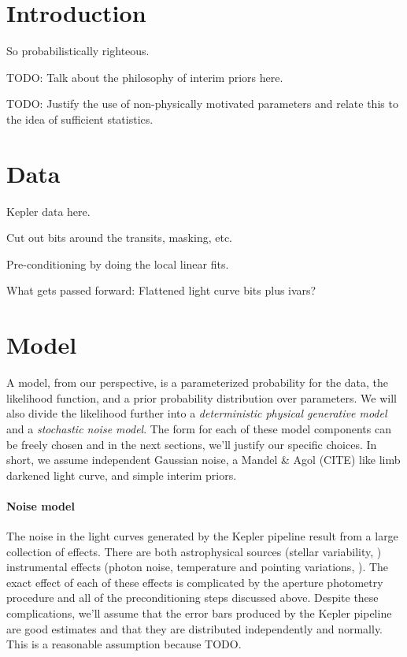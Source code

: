 \documentclass[12pt,preprint]{aastex}
\begin{document}
\section{Introduction}

So probabilistically righteous.

TODO: Talk about the philosophy of interim priors here.

TODO: Justify the use of non-physically motivated parameters and relate this
to the idea of sufficient statistics.

\section{Data}

Kepler data here.

Cut out bits around the transits, masking, etc.

Pre-conditioning by doing the local linear fits.

What gets passed forward:  Flattened light curve bits plus ivars?

\section{Model}

A model, from our perspective, is a parameterized probability for the data,
the likelihood function, and a prior probability distribution over parameters.
We will also divide the likelihood further into a \emph{deterministic physical
generative model} and a \emph{stochastic noise model}.
The form for each of these model components can be freely chosen and in the
next sections, we'll justify our specific choices.
In short, we assume independent Gaussian noise, a Mandel \& Agol (CITE) like
limb darkened light curve, and simple interim priors.

\paragraph{Noise model}
The noise in the light curves generated by the Kepler pipeline result from a
large collection of effects.
There are both astrophysical sources (stellar variability, \etc) instrumental
effects (photon noise, temperature and pointing variations, \etc).
The exact effect of each of these effects is complicated by the aperture
photometry procedure and all of the preconditioning steps discussed above.
Despite these complications, we'll assume that the error bars produced by the
Kepler pipeline are good estimates and that they are distributed independently
and normally.
This is a reasonable assumption because TODO.
\end{document}
